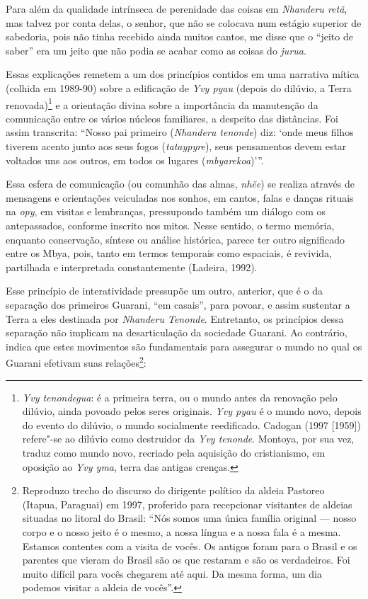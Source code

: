 Para além da qualidade intrínseca de perenidade das coisas em \emph{Nhanderu
retã}, mas talvez por conta delas, o senhor, que não se colocava num
estágio superior de sabedoria, pois não tinha recebido ainda muitos
cantos, me disse que o ``jeito de saber'' era um jeito que não podia se
acabar como as coisas do \emph{jurua}.

Essas explicações remetem a um dos princípios contidos em uma narrativa
mítica (colhida em 1989-90) sobre a edificação de \emph{Yvy pyau} (depois do
dilúvio, a Terra renovada)\footnote{\emph{Yvy tenondegua}: é a primeira terra,
ou o mundo antes da renovação pelo dilúvio, ainda povoado pelos seres
originais. \emph{Yvy pyau} é o mundo novo, depois do evento do dilúvio, o
mundo socialmente reedificado. Cadogan (1997 [1959]) refere"-se ao
dilúvio como destruidor da \emph{Yvy tenonde}. Montoya, por sua vez, traduz
como mundo novo, recriado pela aquisição do cristianismo, em oposição
ao \emph{Yvy yma}, terra das antigas crenças. } e a orientação divina sobre a
importância da manutenção da comunicação entre os vários núcleos
familiares, a despeito das distâncias. Foi assim transcrita: ``Nosso pai
primeiro (\emph{Nhanderu tenonde}) diz: ‘onde meus filhos tiverem acento junto
aos seus fogos (\emph{tataypyre}), seus pensamentos devem estar voltados uns
aos outros, em todos os lugares (\emph{mbyarekoa})’''. 

Essa esfera de comunicação (ou comunhão das almas, \emph{nhẽe}) se
realiza através de mensagens e orientações veiculadas nos sonhos, em
cantos, falas e danças rituais na \emph{opy}, em visitas e lembranças,
pressupondo também um diálogo com os antepassados, conforme inscrito
nos mitos. Nesse sentido, o termo memória, enquanto conservação,
síntese ou análise histórica, parece ter outro significado entre os
Mbya, pois, tanto em termos temporais como espaciais, é revivida,
partilhada e interpretada constantemente (Ladeira, 1992). 

Esse princípio de interatividade pressupõe um outro, anterior, que é o
da separação dos primeiros Guarani, ``em casais'', para povoar, e assim
sustentar a Terra a eles destinada por \emph{Nhanderu Tenonde}. Entretanto, os
princípios dessa separação não implicam na desarticulação da sociedade
Guarani. Ao contrário, indica que estes movimentos são fundamentais
para assegurar o mundo no qual os Guarani efetivam suas
relações\footnote{Reproduzo trecho do discurso do dirigente político da
aldeia Pastoreo (Itapua, Paraguai) em 1997, proferido para recepcionar
visitantes de aldeias situadas no litoral do Brasil: ``Nós somos uma
única família original --- nosso corpo e o nosso jeito é o mesmo, a nossa
língua e a nossa fala é a mesma. Estamos contentes com a visita de
vocês. Os antigos foram para o Brasil e os parentes que vieram do
Brasil são os que restaram e são os verdadeiros. Foi muito difícil para
vocês chegarem até aqui. Da mesma forma, um dia podemos visitar a
aldeia de vocês''.}:

